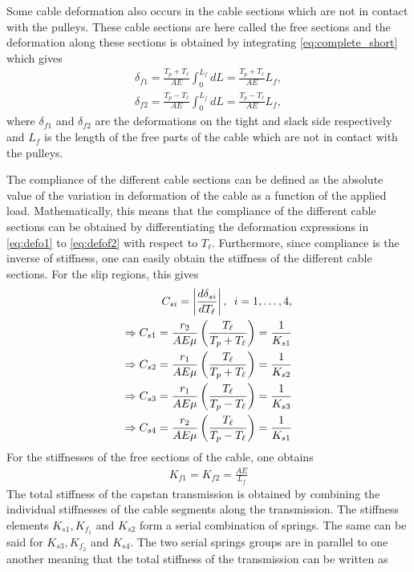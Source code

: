 \documentclass[10pt,cleanfoot]{asme2ej}
\newcommand{\hquad}{\hspace{0.5em}}
\begin{document}
Some cable deformation also occurs in the cable sections which are not in contact with the pulleys. These cable sections are here called the free sections and the deformation along these sections is obtained by integrating \eqref{eq:complete_short} which gives
\begin{align}
\delta_{f1} = \frac{T_p+T_\ell}{AE}\int_0^{L_f}dL=\frac{T_p+T_\ell}{AE}L_f,\label{eq:defof1}\\
\delta_{f2}=\frac{T_p-T_\ell}{AE}\int_0^{L_f}dL=\frac{T_p-T_\ell}{AE}L_f,\label{eq:defof2}
\end{align}
where $\delta_{f1}$ and $\delta_{f2}$ are the deformations on the tight and slack side respectively and $L_f$ is the length of the free parts of the cable which are not in contact with the pulleys.
\par
 The compliance of the different cable sections can be defined as the absolute value of the variation in deformation of the cable as a function of the applied load. Mathematically, this means that the compliance of the different cable sections can be obtained by differentiating the deformation expressions in \eqref{eq:defo1} to \eqref{eq:defof2} with respect to $T_\ell$. Furthermore, since compliance is the inverse of stiffness, one can easily obtain the stiffness of the different cable sections. For the slip regions, this gives
 \begin{align}
     C_{si}=\left|\frac{d\delta_{si}}{dT_\ell}\right|,\hquad i = 1,\ldots ,4,\label{eq:simple_stiff_1}\\
     \Rightarrow C_{s1} = \frac{r_2}{AE\mu}\left(\frac{T_\ell}{T_p+T_\ell}\right) = \frac{1}{K_{s1}}\\
     \Rightarrow C_{s2} = \frac{r_1}{AE\mu}\left(\frac{T_\ell}{T_p+T_\ell}\right)= \frac{1}{K_{s2}}\\
     \Rightarrow C_{s3} =
     \frac{r_1}{AE\mu}\left(\frac{T_\ell}{T_p-T_\ell}\right)= \frac{1}{K_{s3}}\\
     \Rightarrow C_{s4} =
     \frac{r_2}{AE\mu}\left(\frac{T_\ell}{T_p-T_\ell}\right)= \frac{1}{K_{s1}}\label{eq:simple_stiff_4}
 \end{align}
 For the stiffnesses of the free sections of the cable, one obtains
 \begin{align}
     K_{f1}=K_{f2}=\frac{AE}{L_f}
 \end{align}
 The total stiffness of the capstan transmission is obtained by combining the individual stiffnesses of the cable segments along the transmission. The stiffness elements $K_{s1},K_{f_1}$ and $K_{s2}$ form a serial combination of springs. The same can be said for $K_{s3},K_{f_2}$ and $K_{s4}$. The two serial springs groups are in parallel to one another meaning that the total stiffness of the transmission can be written as 
\end{document}
